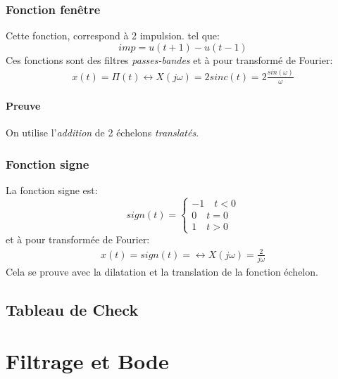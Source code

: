 \documentclass{report}
\begin{document}
\subsection{Fonction fenêtre} \label{window}
Cette fonction, correspond à 2 impulsion. tel que:
\begin{equation}
imp = u(t+1) - u(t-1)
\end{equation}
Ces fonctions sont des filtres \textit{passes-bandes} et à pour transformé de Fourier:
\begin{align*}
x(t) = \Pi (t) \longleftrightarrow X(j\omega) = 2 sinc(t) = 2\frac{sin(\omega)}{\omega}
\end{align*}

\subsubsection{Preuve}
On utilise l'\textit{addition} de 2 échelons \textit{translatés}.

\subsection{Fonction signe}
La fonction signe est:
\begin{equation}
sign(t) = \begin{cases}
-1 \quad t < 0\\
0 \quad t = 0\\
1 \quad t > 0
\end{cases}
\end{equation}
et à pour transformée de Fourier:
\begin{align*}
x(t) = sign(t) = \longleftrightarrow X(j\omega) = \frac{2}{j\omega}
\end{align*}
Cela se prouve avec la dilatation et la translation de la fonction échelon.

\section{Tableau de Check}

\chapter{Filtrage et Bode}
\end{document}
